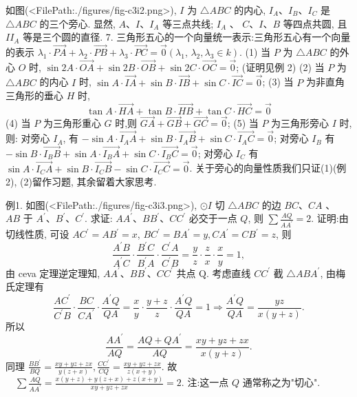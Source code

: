 如图(<FilePath:./figures/fig-c3i2.png>), $I$ 为 $\triangle A B C$ 的内心, $I_A 、 I_B 、 I_C$ 是 $\triangle A B C$ 的三个旁心.
显然, $A 、 I 、 I_A$ 等三点共线; $I_A$ 、 $C 、 I 、 B$ 等四点共圆, 且 $I I_A$ 等是三个圆的直径.
7. 三角形五心的一个向量统一表示:三角形五心有一个向量的表示 $\lambda_1 \cdot \overrightarrow{P A}+\lambda_2 \cdot \overrightarrow{P B}+\lambda_3 \cdot \overrightarrow{P C}=\overrightarrow{0}\left(\lambda_1\right.$, $\left.\lambda_2, \lambda_3 \in k\right)$.
(1) 当 $P$ 为 $\triangle A B C$ 的外心 $O$ 时, $\sin 2 A \cdot \overrightarrow{O A}+\sin 2 B \cdot \overrightarrow{O B}+\sin 2 C \cdot \overrightarrow{O C}=\overrightarrow{0}$; (证明见例 2)
(2) 当 $P$ 为 $\triangle A B C$ 的内心 $I$ 时, $\sin A \cdot \overrightarrow{I A}+\sin B \cdot \overrightarrow{I B}+\sin C \cdot \overrightarrow{I C}=\overrightarrow{0}$;
(3) 当 $P$ 为非直角三角形的垂心 $H$ 时,
$$
\tan A \cdot \overrightarrow{H A}+\tan B \cdot \overrightarrow{H B}+\tan C \cdot \overrightarrow{H C}=\overrightarrow{0}
$$
(4) 当 $P$ 为三角形重心 $G$ 时,则 $\overrightarrow{G A}+\overrightarrow{G B}+\overrightarrow{G C}=\overrightarrow{0}$;
(5) 当 $P$ 为三角形旁心 $I$ 时, 则: 对旁心 $I_A$, 有 $-\sin A \cdot \overrightarrow{I_A A}+\sin B \cdot \overrightarrow{I_A B}+ \sin C \cdot \overrightarrow{I_A C}=\overrightarrow{0}$; 对旁心 $I_B$ 有 $-\sin B \cdot \overrightarrow{I_B B}+\sin A \cdot \overrightarrow{I_B A}+\sin C \cdot \overrightarrow{I_B C}=\overrightarrow{0}$; 对旁心 $I_C$ 有 $\sin A \cdot \overrightarrow{I_C A}+\sin B \cdot \overrightarrow{I_C B}-\sin C \cdot \overrightarrow{I_C C}=\overrightarrow{0}$.
关于旁心的向量性质我们只证(1)(例 2), (2)留作习题, 其余留着大家思考.



例1. 如图(<FilePath:./figures/fig-c3i3.png>), $\odot I$ 切 $\triangle A B C$ 的边 $B C 、 C A$ 、 $A B$ 于 $A^{\prime} 、 B^{\prime} 、 C^{\prime}$. 求证: $A A^{\prime} 、 B B^{\prime} 、 C C^{\prime}$ 必交于一点 $Q$, 则 $\sum \frac{A Q}{A A^{\prime}}=2$.
证明:由切线性质, 可设 $A C^{\prime}=A B^{\prime}=x$, $B C^{\prime}=B A^{\prime}=y, C A^{\prime}=C B^{\prime}=z$, 则
$$
\frac{A^{\prime} B}{A^{\prime} C} \cdot \frac{B^{\prime} C}{B^{\prime} A} \cdot \frac{C^{\prime} A}{C^{\prime} B}=\frac{y}{z} \cdot \frac{z}{x} \cdot \frac{x}{y}=1,
$$
由 ceva 定理逆定理知, $A A^{\prime} 、 B B^{\prime} 、 C C^{\prime}$ 共点 $\mathrm{Q}$.
考虑直线 $C C^{\prime}$ 截 $\triangle A B A^{\prime}$, 由梅氏定理有
$$
\frac{A C^{\prime}}{C^{\prime} B} \cdot \frac{B C}{C A^{\prime}} \cdot \frac{A^{\prime} Q}{Q A}=\frac{x}{y} \cdot \frac{y+z}{z} \cdot \frac{A^{\prime} Q}{Q A}=1 \Rightarrow \frac{A^{\prime} Q}{Q A}=\frac{y z}{x(y+z)} .
$$
所以
$$
\frac{A A^{\prime}}{A Q}=\frac{A Q+Q A^{\prime}}{A Q}=\frac{x y+y z+z x}{x(y+z)} .
$$
同理 $\frac{B B^{\prime}}{B Q}=\frac{x y+y z+z x}{y(z+x)}, \frac{C C^{\prime}}{C Q}=\frac{x y+y z+z x}{z(x+y)}$.
故 $\quad \sum \frac{A Q}{A A^{\prime}}=\frac{x(y+z)+y(z+x)+z(x+y)}{x y+y z+z x}=2$.
注:这一点 $Q$ 通常称之为"切心".



